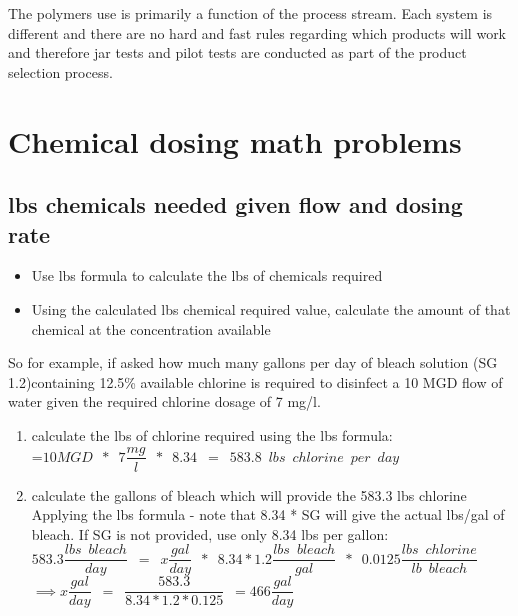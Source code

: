 The polymers use is primarily a function of the process stream.  Each system is different and there are no hard and fast rules regarding which products will work and therefore jar tests and pilot tests are conducted as part of the product selection process.\\

\section{Chemical dosing math problems}
\subsection{lbs chemicals needed given flow and dosing rate}

\begin{itemize}
\item Use lbs formula to calculate the lbs of chemicals required\\
\item Using the calculated lbs chemical required value, calculate the amount of that chemical at the concentration available
\end{itemize}

So for example, if asked how much many gallons per day of bleach solution (SG 1.2)containing 12.5\% available chlorine is required to disinfect a 10 MGD flow of water given the required chlorine dosage of 7 mg/l.\\
\begin{enumerate}
\item calculate the lbs of chlorine required using the lbs formula:\\
\vspace{0.5cm}
=$10 MGD \enspace * \enspace 7 \dfrac{mg}{l} \enspace * \enspace 8.34\enspace=\enspace 583.8 \enspace lbs \enspace chlorine \enspace per \enspace day$\\
\vspace{0.5cm}
\item calculate the gallons of bleach which will provide the 583.3 lbs chlorine\\
\vspace{0.5cm}
Applying the lbs formula - note that 8.34 * SG will give the actual lbs/gal of bleach.  If SG is not provided, use only 8.34 lbs per gallon:\\
\vspace{0.5cm}
$583.3 \dfrac{lbs \enspace bleach}{day}\enspace=\enspace x \dfrac{gal}{day} \enspace * \enspace 8.34 * 1.2 \dfrac{lbs \enspace bleach}{gal} \enspace * \enspace 0.0125 \dfrac{lbs \enspace chlorine}{lb \enspace bleach} \enspace $\\
\vspace{0.5cm}
$ \implies x \dfrac{gal}{day}\enspace = \enspace \dfrac{583.3}{8.34*1.2*0.125} \enspace = \boxed{466 \dfrac{gal}{day}}$
\end{enumerate}

